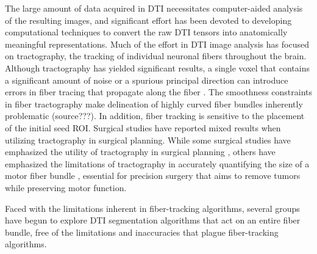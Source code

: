 \documentclass[10pt,a4paper, journal]{IEEEtran}
\begin{document}
The large amount of data acquired in DTI necessitates computer-aided analysis of the resulting images, and significant effort has been devoted to developing computational techniques to convert the raw DTI tensors into anatomically meaningful representations.  Much of the effort in DTI image analysis has focused on tractography, the tracking of individual neuronal fibers throughout the brain.  Although tractography has yielded significant results, a single voxel that contains a significant amount of noise or a spurious principal direction can introduce errors in fiber tracing that propagate along the fiber \cite{chung_principles_2011,yamada_diffusion_2009}.  The smoothness constraints in fiber tractography make delineation of highly curved fiber bundles inherently problematic (source???). In addition, fiber tracking is sensitive to the placement of the initial seed ROI.  Surgical studies have reported mixed results when utilizing tractography in surgical planning.  While some surgical studies have emphasized the utility of tractography in surgical planning \cite{coenen_intraoperative_2003}, others have emphasized the limitations of tractography in accurately quantifying the size of a motor fiber bundle \cite{kinoshita_fiber-tracking_2005}, essential for precision surgery that aims to remove tumors while preserving motor function. 

Faced with the limitations inherent in fiber-tracking algorithms, several groups have begun to explore DTI segmentation algorithms that act on an entire fiber bundle, free of the limitations and inaccuracies that plague fiber-tracking algorithms.



\end{document}
